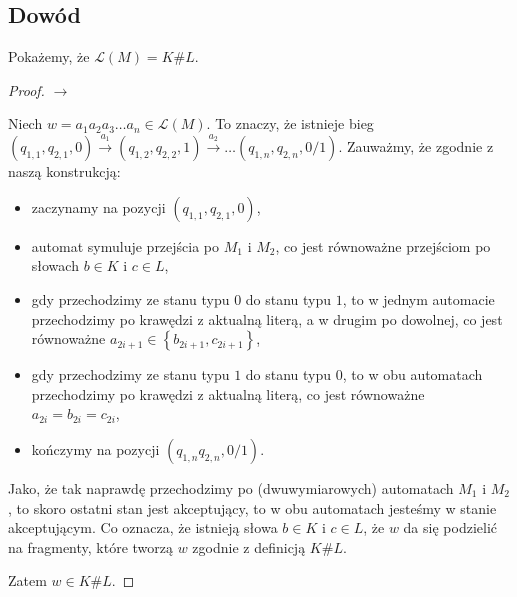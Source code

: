 \documentclass{article}
\theoremstyle{definition}
\theoremstyle{remark}
\begin{document}
\subsection{Dowód}

Pokażemy, że \(\mathcal{L}(M) = K \# L\).

\begin{proof}
    \(\rightarrow\)

    Niech \(w = a_1 a_2 a_3\ldots a_n \in \mathcal{L}(M)\). To znaczy, że istnieje bieg \( \left(q_{1,1}, q_{2,1}, 0 \right) \xrightarrow{a_1} \left(q_{1,2}, q_{2,2}, 1 \right) \xrightarrow{a_2} \ldots \left(q_{1,n}, q_{2,n}, 0/1 \right) \).
    Zauważmy, że zgodnie z naszą konstrukcją: 
    \begin{itemize}
        \item zaczynamy na pozycji \(\left(q_{1,1}, q_{2,1}, 0 \right)\),
        \item automat symuluje przejścia po \(M_1\) i \(M_2\), co jest równoważne przejściom po słowach \(b \in K\) i \(c \in L\),
        \item gdy przechodzimy ze stanu typu \(0\) do stanu typu \(1\), to w jednym automacie przechodzimy po krawędzi z aktualną literą, a w drugim po dowolnej,
        co jest równoważne \(a_{2i+1} \in \left\{ b_{2i+1}, c_{2i+1} \right\}\),
        \item gdy przechodzimy ze stanu typu \(1\) do stanu typu \(0\), to w obu automatach przechodzimy po krawędzi z aktualną literą,
        co jest równoważne \( a_{2i} = b_{2i} = c_{2i} \),
        \item kończymy na pozycji \(\left(q_{1,n} q_{2,n}, 0/1 \right)\).
    \end{itemize}

    Jako, że tak naprawdę przechodzimy po (dwuwymiarowych) automatach \(M_1\) i \(M_2\), to skoro ostatni stan jest akceptujący, to w obu automatach jesteśmy w stanie akceptującym.
    Co oznacza, że istnieją słowa \(b \in K\) i \(c \in L\), że \(w\) da się podzielić na fragmenty, które tworzą \(w\) zgodnie z definicją \(K \# L\).

    Zatem \(w \in K \# L\).

\end{proof}
\end{document}
